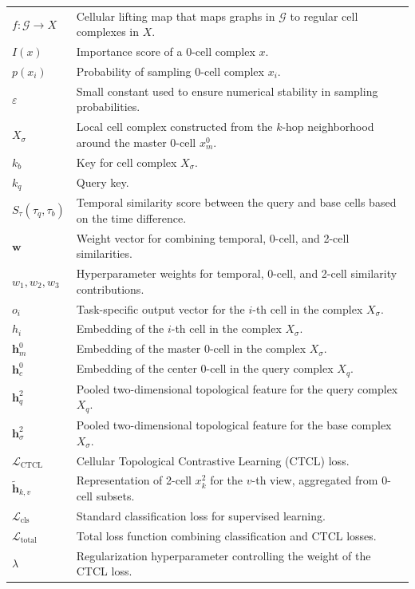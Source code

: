 \begin{table}[h!]
\begin{tabular}{@{}lp{11cm}@{}}
$f : \mathcal{G} \to X$ & Cellular lifting map that maps graphs in $\mathcal{G}$ to regular cell complexes in $X$. \\
$I(x)$ & Importance score of a 0-cell complex $x$.\\
$p(x_i)$ & Probability of sampling 0-cell complex $x_i$.  \\
$\varepsilon$ & Small constant used to ensure numerical stability in sampling probabilities. \\
$X_\sigma$ & Local cell complex constructed from the $k$-hop neighborhood around the master 0-cell $x_m^0$. \\
$k_b$ & Key for cell complex $X_\sigma$. \\
$k_q$ & Query key. \\
$S_\tau(\tau_q, \tau_b)$ & Temporal similarity score between the query and base cells based on the time difference. \\
$\mathbf{w}$ & Weight vector for combining temporal, 0-cell, and 2-cell similarities. \\
$w_1, w_2, w_3$ & Hyperparameter weights for temporal, 0-cell, and 2-cell similarity contributions. \\
$o_i$ & Task-specific output vector for the $i$-th cell in the complex $X_\sigma$. \\
$h_i$ & Embedding of the $i$-th cell in the complex $X_\sigma$. \\
$\bm{h}_m^0$ & Embedding of the master 0-cell in the complex $X_\sigma$. \\
$\bm{h}_c^0$ & Embedding of the center 0-cell in the query complex $X_q$. \\
$\bm{h}_q^2$ & Pooled two-dimensional topological feature for the query complex $X_q$. \\
$\bm{h}_\sigma^2$ & Pooled two-dimensional topological feature for the base complex $X_\sigma$. \\
$\mathcal{L}_{\text{CTCL}}$ & Cellular Topological Contrastive Learning (CTCL) loss. \\
$\tilde{\bm{h}}_{k,v}$ & Representation of 2-cell $x_k^2$ for the $v$-th view, aggregated from 0-cell subsets. \\
$\mathcal{L}_{\text{cls}}$ & Standard classification loss for supervised learning. \\
$\mathcal{L}_{\text{total}}$ & Total loss function combining classification and CTCL losses. \\
$\lambda$ & Regularization hyperparameter controlling the weight of the CTCL loss. \\
\bottomrule
\end{tabular}

\label{tab:notions}
\end{table}
